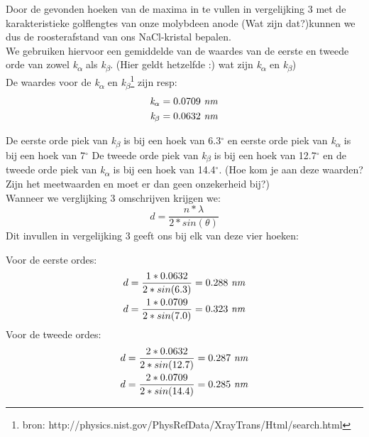 \documentclass[a4paper]{article}
\begin{document}
 Door de gevonden hoeken van de maxima in te vullen in vergelijking 3 met de karakteristieke golflengtes van onze molybdeen anode {\color{red}(Wat zijn dat?)}kunnen we dus de roosterafstand van ons NaCl-kristal bepalen. \\
 We gebruiken hiervoor een gemiddelde van de waardes van de eerste en tweede orde van zowel \textit{k\textsubscript{$\alpha$}} als \textit{k\textsubscript{$\beta$}}.
 {\color{red}(Hier geldt hetzelfde :) wat zijn \textit{k\textsubscript{$\alpha$}} en \textit{k\textsubscript{$\beta$}})}\\
 
 De waardes voor de \textit{k\textsubscript{$\alpha$}} en \textit{k\textsubscript{$\beta$}}\footnote{bron: http://physics.nist.gov/PhysRefData/XrayTrans/Html/search.html} zijn resp: 
 \begin{align*}
 \textit{k\textsubscript{$\alpha$}}=\text{0.0709 \textit{nm}}\\
 \textit{k\textsubscript{$\beta$}}=\text{0.0632 \textit{nm}}
 \end{align*}

 De eerste orde piek van \textit{k\textsubscript{$\beta$}} is bij een hoek van 6.3$^{\circ}$ en eerste orde piek van \textit{k\textsubscript{$\alpha$}} is bij een hoek van 7$^{\circ}$
 De tweede orde piek van \textit{k\textsubscript{$\beta$}} is bij een hoek van 12.7$^{\circ}$ en de tweede orde piek van \textit{k\textsubscript{$\alpha$}} is bij een hoek van 14.4$^{\circ}$. {\color{red}(Hoe kom je aan deze waarden? Zijn het meetwaarden en moet er dan geen onzekerheid bij?)}\\
 Wanneer we verglijking 3 omschrijven krijgen we:
 $$
 d=\dfrac{n*\lambda}{2*sin(\theta)}
 $$
Dit invullen in vergelijking 3 geeft ons bij elk van deze vier hoeken:

Voor de eerste ordes:\\
 \begin{align*}
d=\dfrac{1*0.0632}{2*sin(6.3)}=\text{0.288 \textit{nm}}\\
d=\dfrac{1*0.0709}{2*sin(7.0)}=\text{0.323 \textit{nm}}\\
\end{align*}
   Voor de tweede ordes:\\
\begin{align*}
d=\dfrac{2*0.0632}{2*sin(12.7)}=\text{0.287 \textit{nm}}\\
d=\dfrac{2*0.0709}{2*sin(14.4)}=\text{0.285 \textit{nm}}\\
 \end{align*}
\end{document}
